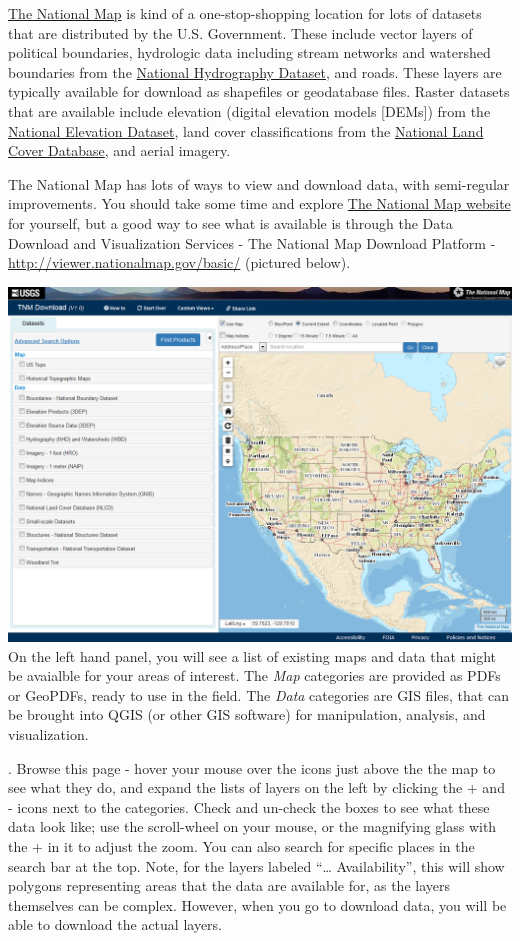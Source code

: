 \documentclass[12pt,]{article}
\begin{document}
\href{http://nationalmap.gov/}{The National Map} is kind of a
one-stop-shopping location for lots of datasets that are distributed by
the U.S. Government. These include vector layers of political
boundaries, hydrologic data including stream networks and watershed
boundaries from the \href{http://nhd.usgs.gov/}{National Hydrography
Dataset}, and roads. These layers are typically available for download
as shapefiles or geodatabase files. Raster datasets that are available
include elevation (digital elevation models {[}DEMs{]}) from the
\href{http://ned.usgs.gov/}{National Elevation Dataset}, land cover
classifications from the \href{http://www.mrlc.gov/}{National Land Cover
Database}, and aerial imagery.

The National Map has lots of ways to view and download data, with
semi-regular improvements. You should take some time and explore
\href{http://nationalmap.gov/}{The National Map website} for yourself,
but a good way to see what is available is through the Data Download and
Visualization Services - The National Map Download Platform -
\url{http://viewer.nationalmap.gov/basic/} (pictured below).

\includegraphics{../Assignment_Images/TNM_DownloadPlatform.PNG}\\ On the
left hand panel, you will see a list of existing maps and data that
might be avaialble for your areas of interest. The \emph{Map} categories
are provided as PDFs or GeoPDFs, ready to use in the field. The
\emph{Data} categories are GIS files, that can be brought into QGIS (or
other GIS software) for manipulation, analysis, and visualization.

. Browse this page - hover your mouse over the icons just above the the
map to see what they do, and expand the lists of layers on the left by
clicking the + and - icons next to the categories. Check and un-check
the boxes to see what these data look like; use the scroll-wheel on your
mouse, or the magnifying glass with the + in it to adjust the zoom. You
can also search for specific places in the search bar at the top. Note,
for the layers labeled ``\ldots{} Availability'', this will show
polygons representing areas that the data are available for, as the
layers themselves can be complex. However, when you go to download data,
you will be able to download the actual layers.
\end{document}
